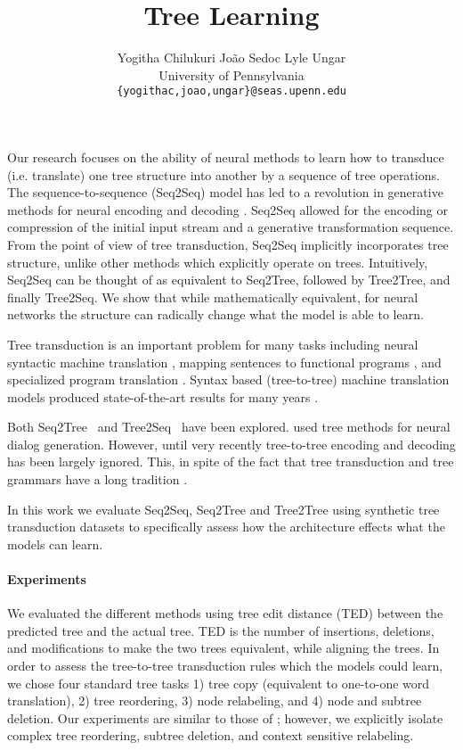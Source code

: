 \documentclass[11pt,a4paper]{article}
\title{Tree Learning}
\author{\quad Yogitha Chilukuri \quad Jo\~{a}o Sedoc \quad Lyle Ungar\\
  University of Pennsylvania\\
  {\tt \{yogithac,joao,ungar\}@seas.upenn.edu}
}
\date{}
\begin{document}
\maketitle

Our research focuses on the ability of neural methods to learn how to transduce (i.e. translate) one tree structure into another by a sequence of tree operations.
The sequence-to-sequence (Seq2Seq) model has led to a revolution in generative methods for neural encoding and decoding \citep{sutskever2014sequence}. Seq2Seq allowed for the encoding or compression of the initial input stream and a generative transformation sequence. From the point of view of tree transduction, Seq2Seq implicitly incorporates tree structure, unlike other methods which explicitly operate on trees.  
Intuitively, Seq2Seq can be thought of as equivalent to Seq2Tree, followed by Tree2Tree, and finally Tree2Seq. We show that while mathematically equivalent, for neural networks the structure can radically change what the model is able to learn.

Tree transduction is an important problem for many tasks including neural syntactic machine translation \citep{cowan2008tree,razmara2011application,wang2007chinese}, mapping sentences to functional programs \citep{alvarez2017tree}, and specialized program translation \citep{alur2012streaming}.
Syntax based (tree-to-tree) machine translation models produced state-of-the-art results for many years \citep{cowan2008tree,razmara2011application}. 

Both Seq2Tree~\citep{aharoni2017towards,Zhang2015-bg,Dong2016-qq} and Tree2Seq~\citep{eriguchi2016character} have been explored. \citet{zhou2018tree} used tree methods for neural dialog generation. However, until very recently tree-to-tree encoding and decoding has been largely ignored. 
This, in spite of the fact that tree transduction and tree grammars have a long tradition  \citep{engelfriet1975bottom,graehl2004training,cowan2008tree}. 

In this work we evaluate Seq2Seq, Seq2Tree and Tree2Tree using synthetic tree transduction datasets to specifically assess how the architecture effects what the models can learn.

\paragraph{Experiments}
We evaluated the different methods using tree edit distance (TED) \citep{tai1979tree,bille2005survey} between the predicted tree and the actual tree. TED is the number of insertions, deletions, and modifications to make the two trees equivalent, while aligning the trees. In order to assess the tree-to-tree transduction rules which the models could learn, we chose four standard tree tasks 1) tree copy (equivalent to one-to-one word translation), 2) tree reordering, 3) node relabeling, and 4) node and subtree deletion. Our experiments are similar to those of \citet{grefenstette2015learning}; however, we explicitly isolate complex tree reordering, subtree deletion, and context sensitive relabeling. 
\end{document}
